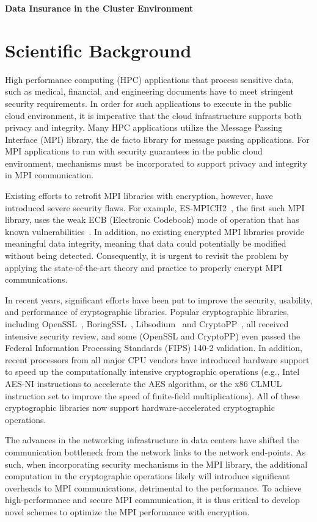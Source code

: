 \centerline{\Large\bfseries Data Insurance in the Cluster Environment}

\section{Scientific Background}
High performance computing (HPC) applications that process %
sensitive data, such as medical, financial, and engineering documents have
to meet stringent security requirements. In order for such applications to execute in
the public cloud environment, it is imperative that the cloud infrastructure
supports both privacy and integrity. Many HPC applications utilize the Message
Passing Interface (MPI) library, the de facto library for message
passing applications. For MPI applications to run with security
guarantees in the public cloud environment, mechanisms must be
incorporated to support privacy and integrity in MPI communication.

Existing efforts to retrofit MPI libraries with encryption, however,
have introduced severe security flaws. For example,
ES-MPICH2~\cite{Ruan:2012:EMP:2197079.2197242}, the first such MPI library,
uses the weak ECB (Electronic Codebook) mode of operation that has known
vulnerabilities~\cite[page 89]{Book:KL14}.
In addition, no existing encrypted MPI libraries provide meaningful data
integrity, meaning that data could potentially be modified without being
detected. Consequently, it is urgent to revisit the problem by applying
the state-of-the-art theory and practice to properly
encrypt MPI communications.

In recent years, significant efforts have been put to improve the security,
usability, and performance of cryptographic libraries.
Popular cryptographic libraries, including OpenSSL~\cite{openssl},
BoringSSL~\cite{boringssl},
Libsodium~\cite{libsodium} and CryptoPP~\cite{cryptopp}, all received intensive
security review,
and some (OpenSSL and CryptoPP) even passed the Federal Information Processing
Standards  (FIPS) 140-2 validation. In addition, recent processors from
all major CPU vendors have introduced hardware support to speed up
the computationally intensive
cryptographic operations (e.g., Intel AES-NI instructions to accelerate the AES
algorithm, or the x86 CLMUL instruction set to improve the speed of finite-field
multiplications). All of these cryptographic libraries
now support hardware-accelerated cryptographic operations.

The advances in the networking infrastructure in data centers have
shifted the communication bottleneck from the network links to the network
end-points. As such, when incorporating security mechanisms in
the MPI library, the additional computation in the cryptographic operations
likely will introduce significant overheads to MPI communications,  %
detrimental to the performance. To achieve high-performance and
secure MPI communication, it is thus critical to develop novel schemes to optimize
the MPI performance with encryption. 

